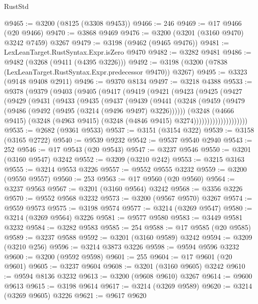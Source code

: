 \begin{lexlean}{RustStd}
\begin{coremodule}
@9465 := @3200 (@8125 (@3308 @9453))
@9466 := 246
@9469 := @17 @9466 (@20 @9466)
@9470 := @3868 @9469
@9476 := @3200 (@3201 (@3160 @9470) @3242 @7459) @3267
@9479 := @3198 (@9462 (@9465 @9476))
@9481 := LexLeanTarget.RustSyntax.Expr.isZero @9470
@9482 := @3282 @9481
@9486 := @9482 (@3268 (@9411 (@4395 @3226)))
@9492 := @3198 (@3200 (@7838 (LexLeanTarget.RustSyntax.Expr.predecessor @9470)) @3267)
@9495 := @3323 (@9148 @9408 @2911)
@9496 := @9370 @8134
@9497 := @3218 @4388
@9533 := @9378
    (@9379
      (@9403
        (@9405
          (@9417
            (@9419
              (@9421
                (@9423
                  (@9425
                    (@9427
                      (@9429
                        (@9431
                          (@9433
                            (@9435
                              (@9437
                                (@9439
                                  (@9441
                                    (@3248
                                      (@9459
                                        (@9479 (@9486 (@9492 (@9495 (@3214 (@9496 @9497) @3226))))))
                                      (@3248
                                        (@4666 @9415)
                                        (@3248
                                          (@4963 @9415)
                                          (@3248 (@4846 @9415) @3274))))))))))))))))))))
@9535 := @2682 (@9361 @9533)
@9537 := @3151 (@3154 @322)
@9539 := @3158 (@3165 @2722)
@9540 := @9539 @9232
@9542 := @9537 @9540 @2940
@9543 := 252
@9546 := @17 @9543 (@20 @9543)
@9547 := @3237 @9546
@9550 := @3201 (@3160 @9547) @3242
@9552 := @3209 (@3210 @242)
@9553 := @3215 @3163
@9555 := @3214 @9553 @3226
@9557 := @9552 @9555 @3232
@9559 := @3200 (@9550 @9557)
@9560 := 253
@9563 := @17 @9560 (@20 @9560)
@9564 := @3237 @9563
@9567 := @3201 (@3160 @9564) @3242
@9568 := @3356 @3226
@9570 := @9552 @9568 @3232
@9573 := @3200 (@9567 @9570) @3267
@9574 := @9559 @9573
@9575 := @3198 @9574
@9577 := @3214 (@3269 @9547)
@9580 := @3214 (@3269 @9564) @3226
@9581 := @9577 @9580
@9583 := @3449 @9581 @3232
@9584 := @3282 @9583
@9585 := 254
@9588 := @17 @9585 (@20 @9585)
@9589 := @3237 @9588
@9592 := @3201 (@3160 @9589) @3242
@9594 := @3209 (@3210 @256)
@9596 := @3214 @3873 @3226
@9598 := @9594 @9596 @3232
@9600 := @3200 (@9592 @9598)
@9601 := 255
@9604 := @17 @9601 (@20 @9601)
@9605 := @3237 @9604
@9608 := @3201 (@3160 @9605) @3242
@9610 := @9594 @8136 @3232
@9613 := @3200 (@9608 @9610) @3267
@9614 := @9600 @9613
@9615 := @3198 @9614
@9617 := @3214 (@3269 @9589)
@9620 := @3214 (@3269 @9605) @3226
@9621 := @9617 @9620

\end{coremodule}
\end{lexlean}
